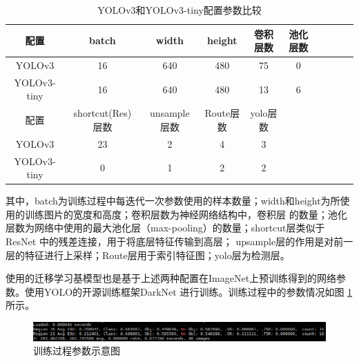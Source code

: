 {
    \begin{table}[htb] 
        \caption{YOLOv3和YOLOv3-tiny配置参数比较}
        \label{table:model:config}
        \centering
        \begin{tabular}[t]{c|c|c|c|c|cc|c|c|c}
            \hline
            配置 & batch & width & height & 卷积层数 & 池化层数  \\
            \hline
            YOLOv3 & 16 & 640 & 480 & 75 & 0 \\
            \hline
            YOLOv3-tiny & 16 & 640 & 480 & 13 & 6 \\
            \hline
            配置 & shortcut(Res)层数 & unsample层数 & Route层数 & yolo层数\\
            \hline
            YOLOv3 & 23 & 2 & 4 & 3\\
            \hline
            YOLOv3-tiny & 0 & 1 & 2 & 2\\
            \hline
        \end{tabular}
    \end{table}
}

其中，batch为训练过程中每迭代一次参数使用的样本数量；width和height为所使用的训练图片的宽度和高度；卷积层数为神经网络结构中，卷积层
的数量；池化层数为网络中使用的最大池化层（max-pooling）的数量；shortcut层类似于ResNet \cite{ResNet}中的残差连接，用于将底层特征传输到高层；
upsample层的作用是对前一层的特征进行上采样；Route层用于索引特征图；yolo层为检测层。

使用的迁移学习基模型也是基于上述两种配置在ImageNet上预训练得到的网络参数。使用YOLO的开源训练框架DarkNet \cite{DarkNet}
进行训练。训练过程中的参数情况如图 \ref{fig:train:log} 所示。
\begin{figure}[h]
    \centering
    \includegraphics[width=\textwidth]{pic/chap3/train_log.png}
    \caption{训练过程参数示意图}
    \label{fig:train:log}
\end{figure}

